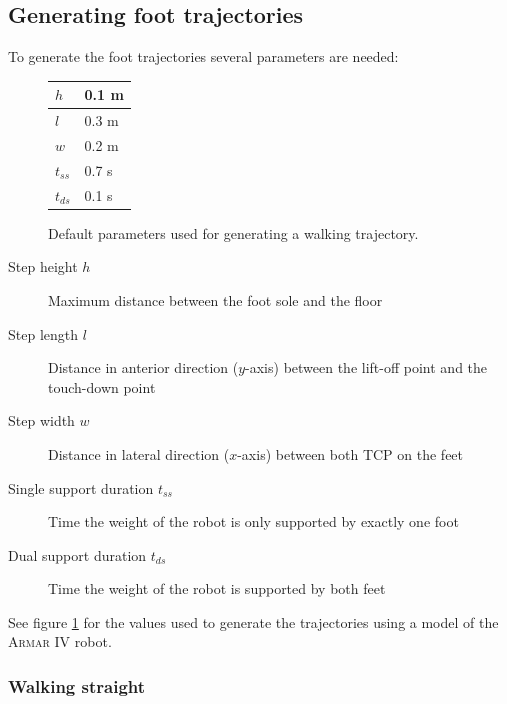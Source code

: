 \documentclass[english,ngerman]{KITreprt}
\newcommand{\name}[1]{\textsc{#1}}
\begin{document}
\subsection{Generating foot
trajectories}\label{generating-foot-trajectories}

To generate the foot trajectories several parameters are needed:

\begin{figure}[b]
\begin{center}
  \begin{tabular}{| l | l |}
    \hline
    $h$ & 0.1 m \\ \hline
    $l$ & 0.3 m \\ \hline
    $w$ & 0.2 m \\ \hline
    $t_{ss}$ & 0.7 s\\ \hline
    $t_{ds}$ & 0.1 s\\ \hline
  \end{tabular}
\end{center}
\caption{Default parameters used for generating a walking trajectory.}
\label{table:pattern-parameters}
\end{figure}

\begin{description}
\item[Step height $h$]
Maximum distance between the foot sole and the floor
\item[Step length $l$]
Distance in anterior direction ($y$-axis) between the lift-off point and
the touch-down point
\item[Step width $w$]
Distance in lateral direction ($x$-axis) between both TCP on the feet
\item[Single support duration $t_{ss}$]
Time the weight of the robot is only supported by exactly one foot
\item[Dual support duration $t_{ds}$]
Time the weight of the robot is supported by both feet
\end{description}

See figure \ref{table:pattern-parameters} for the values used to
generate the trajectories using a model of the \name{Armar IV} robot.

\subsubsection{Walking straight}\label{walking-straight}
\end{document}
